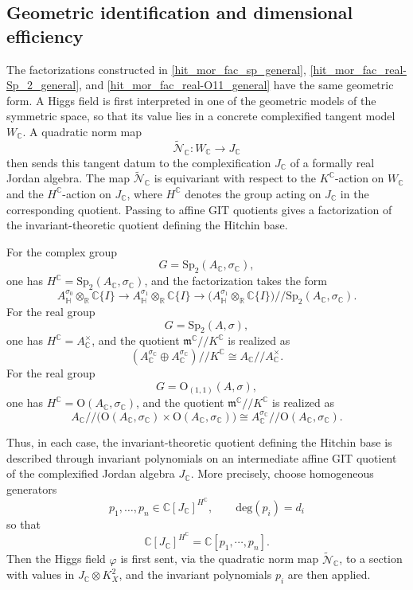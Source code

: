 \documentclass[oneside,11pt]{amsart}
\theoremstyle{definition}
\theoremstyle{remark}
\numberwithin{thm}{section}
\numberwithin{equation}{section}
\begin{document}
\subsection{Geometric identification and dimensional efficiency}




The factorizations constructed in \eqref{hit_mor_fac_sp_general}, \eqref{hit_mor_fac_real-Sp_2_general}, and \eqref{hit_mor_fac_real-O11_general} have the same geometric form. A Higgs field is first interpreted in one of the geometric models of the symmetric space, so that its value lies in a concrete complexified tangent model $W_{\mathbb C}$. A quadratic norm map
\[
\tilde{\mathcal N}_{\mathbb C}: W_{\mathbb C}\longrightarrow J_{\mathbb C}
\]
then sends this tangent datum to the complexification $J_{\mathbb C}$ of a formally real Jordan algebra. The map $\tilde{\mathcal N}_{\mathbb C}$ is equivariant with respect to the $K^{\mathbb{C}}$-action on $W_{\mathbb C}$ and the $H^{\mathbb{C}}$-action on $J_{\mathbb C}$, where $H^{\mathbb{C}}$ denotes the group acting on $J_{\mathbb C}$ in the corresponding quotient. Passing to affine GIT quotients gives a factorization of the invariant-theoretic quotient defining the Hitchin base.

For the complex group
\[
G=\mathrm{Sp}_2(A_{\mathbb C},\sigma_{\mathbb C}),
\]
one has $H^{\mathbb{C}}=\mathrm{Sp}_2(A_{\mathbb C},\sigma_{\mathbb C})$, and the factorization takes the form
\[
A_{\mathbb H}^{\sigma_0}\otimes_{\mathbb R}\mathbb C\{I\}\longrightarrow A_{\mathbb H}^{\sigma_1}\otimes_{\mathbb R}\mathbb C\{I\}
\longrightarrow\bigl(A_{\mathbb H}^{\sigma_1}\otimes_{\mathbb R}\mathbb C\{I\}\bigr)/\!\!/\mathrm{Sp}_2(A_{\mathbb C},\sigma_{\mathbb C}).
\]
For the real group
\[
G=\mathrm{Sp}_2(A,\sigma),
\]
one has $H^{\mathbb{C}}=A_{\mathbb C}^{\times}$, and the quotient $\mathfrak m^{\mathbb C}/\!\!/K^{\mathbb C}$ is realized as
\[
(A_{\mathbb C}^{\sigma_{\mathbb C}}\oplus A_{\mathbb C}^{\sigma_{\mathbb C}})/\!\!/K^{\mathbb C}\cong A_{\mathbb C}/\!\!/A_{\mathbb C}^{\times}.
\]
For the real group 
\[
G=\mathrm{O}_{(1,1)}(A,\sigma),
\]
one has $H^{\mathbb{C}}=\mathrm{O}(A_{\mathbb C},\sigma_{\mathbb C})$, and the quotient $\mathfrak m^{\mathbb C}/\!\!/K^{\mathbb C}$ is realized as
\[
A_{\mathbb C}/\!\!/\bigl(\mathrm{O}(A_{\mathbb C},\sigma_{\mathbb C})\times\mathrm{O}(A_{\mathbb C},\sigma_{\mathbb C})\bigr)\cong A_{\mathbb C}^{\sigma_{\mathbb C}}/\!\!/\mathrm{O}(A_{\mathbb C},\sigma_{\mathbb C}).
\]

Thus, in each case, the invariant-theoretic quotient defining the Hitchin base is described through invariant polynomials on an intermediate affine GIT quotient of the complexified Jordan algebra $J_{\mathbb{C}}$. More precisely, choose homogeneous generators
\[
p_1,\dots,p_n\in \mathbb{C}[J_{\mathbb{C}}]^{H^{\mathbb C}}, \qquad \mathrm{deg}(p_i)=d_i
\]
so that
\[
\mathbb{C}[J_{\mathbb{C}}]^{H^{\mathbb C}}=\mathbb{C}[p_1,\cdots,p_n].
\]
Then the Higgs field $\varphi$ is first sent, via the quadratic norm map $\tilde{\mathcal{N}}_{\mathbb{C}}$, to a section with values in $J_{\mathbb{C}}\otimes K_X^2$, and the invariant polynomials $p_i$ are then applied.
\end{document}

